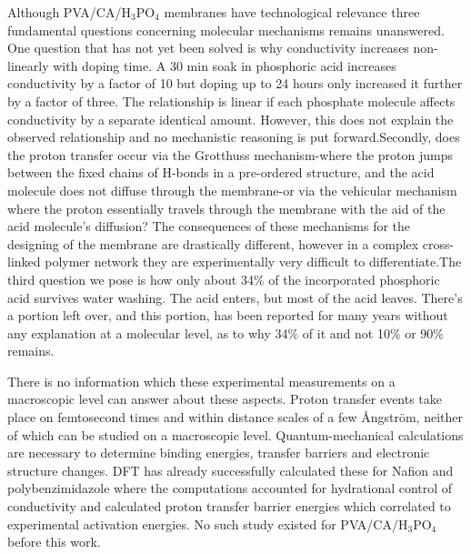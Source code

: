 \documentclass[12pt,a4paper]{report}
\begin{document}
Although PVA/CA/H\(_3\)PO\(_4\) membranes have technological relevance three fundamental questions concerning molecular mechanisms remains unanswered. One question that has not yet been solved is why conductivity increases non-linearly with doping time. A 30 min soak in phosphoric acid increases conductivity by a factor of 10 but doping up to 24 hours only increased it further by a factor of three. The relationship is linear if each phosphate molecule affects conductivity by a separate identical amount. However, this does not explain the observed relationship and no mechanistic reasoning is put forward.\cite{16,17}Secondly, does the proton transfer occur via the Grotthuss mechanism-where the proton jumps between the fixed chains of H-bonds in a pre-ordered structure, and the acid molecule does not diffuse through the membrane-or via the vehicular mechanism where the proton essentially travels through the membrane with the aid of the acid molecule's diffusion? The consequences of these mechanisms for the designing of the membrane are drastically different, however in a complex cross-linked polymer network they are experimentally very difficult to differentiate.\cite{16,17}The third question we pose is how 
only about 34\% of the incorporated phosphoric acid 
survives water washing. The acid enters, but most of 
the acid leaves. There's a portion left over, and this 
portion, has been reported for many years without any 
explanation at a molecular level, as to why 34\% of it 
and not 10\% or 
90\% remains.\cite{35,52}

There is no information which these experimental measurements on a macroscopic level can answer about these aspects. Proton transfer events take place on femtosecond times and within distance scales of a few Ångström, neither of which can be studied on a macroscopic level. Quantum-mechanical calculations are necessary to determine binding energies, transfer barriers and electronic structure changes. DFT has already successfully calculated these for Nafion and polybenzimidazole where the computations accounted for hydrational control of conductivity and calculated proton transfer barrier energies which correlated to experimental activation energies.\cite{18,19} No such study existed 
for PVA/CA/H\(_3\)PO\(_4\) before this work.
\end{document}
